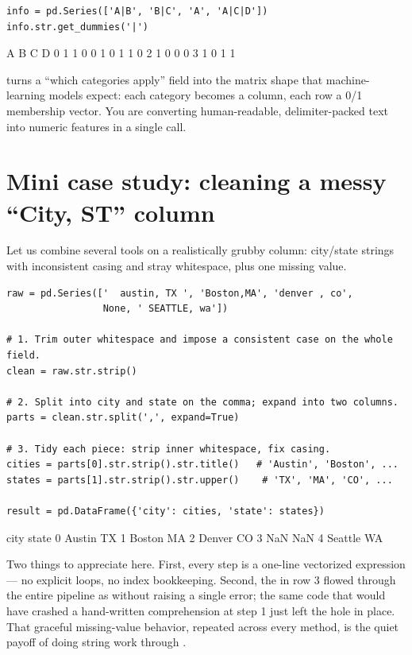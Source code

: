 \documentclass[11pt]{article}
\begin{document}
\begin{lstlisting}
info = pd.Series(['A|B', 'B|C', 'A', 'A|C|D'])
info.str.get_dummies('|')
\end{lstlisting}

\begin{outblock}
   A  B  C  D
0  1  1  0  0
1  0  1  1  0
2  1  0  0  0
3  1  0  1  1
\end{outblock}

\begin{intuition}
 turns a ``which categories apply'' field into the matrix shape that machine-learning models expect: each category becomes a column, each row a 0/1 membership vector. You are converting human-readable, delimiter-packed text into numeric features in a single call.
\end{intuition}

\section{Mini case study: cleaning a messy ``City, ST'' column}

Let us combine several tools on a realistically grubby column: city/state strings with inconsistent casing and stray whitespace, plus one missing value.

\begin{lstlisting}
raw = pd.Series(['  austin, TX ', 'Boston,MA', 'denver , co',
                 None, ' SEATTLE, wa'])

# 1. Trim outer whitespace and impose a consistent case on the whole field.
clean = raw.str.strip()

# 2. Split into city and state on the comma; expand into two columns.
parts = clean.str.split(',', expand=True)

# 3. Tidy each piece: strip inner whitespace, fix casing.
cities = parts[0].str.strip().str.title()   # 'Austin', 'Boston', ...
states = parts[1].str.strip().str.upper()    # 'TX', 'MA', 'CO', ...

result = pd.DataFrame({'city': cities, 'state': states})
\end{lstlisting}

\begin{outblock}
      city state
0   Austin    TX
1   Boston    MA
2   Denver    CO
3      NaN   NaN
4  Seattle    WA
\end{outblock}

Two things to appreciate here. First, every step is a one-line vectorized expression --- no explicit loops, no index bookkeeping. Second, the  in row 3 flowed through the entire pipeline as  without raising a single error; the same code that would have crashed a hand-written comprehension at step 1 just left the hole in place. That graceful missing-value behavior, repeated across every method, is the quiet payoff of doing string work through .
\end{document}
